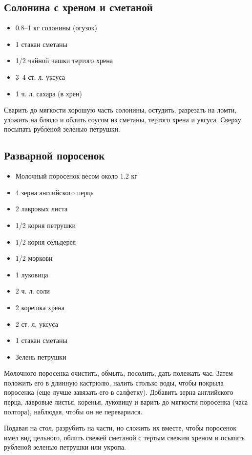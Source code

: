 \subsection{Солонина с хреном и сметаной}

\begin{itemize}
	\item 0.8–1 кг солонины (огузок) 
    \item 1 стакан сметаны
    \item 1/2 чайной чашки тертого хрена
    \item 3–4 ст. л. уксуса
    \item 1 ч. л. сахара (в хрен)
\end{itemize}

Сварить до мягкости хорошую часть солонины, остудить, разрезать на ломти, уложить на блюдо и облить соусом из сметаны, тертого хрена и уксуса. Сверху посыпать рубленой зеленью петрушки.

\subsection{Разварной поросенок}

\begin{itemize}
	\item Молочный поросенок весом около 1.2 кг 
    \item 4 зерна английского перца 
    \item 2 лавровых листа 
    \item 1/2 корня петрушки
    \item 1/2 корня сельдерея
    \item 1/2 моркови 
    \item 1 луковица
    \item 2 ч. л. соли
    \item 2 корешка хрена 
    \item 2 ст. л. уксуса 
    \item 1 стакан сметаны
    \item Зелень петрушки
\end{itemize}

Молочного поросенка очистить, обмыть, посолить, дать полежать час. Затем положить его в длинную кастрюлю, налить столько воды, чтобы покрыла поросенка (еще лучше завязать его в салфетку). Добавить зерна английского перца, лавровые листья, коренья, луковицу и варить до мягкости поросенка (часа полтора), наблюдая, чтобы он не переварился.

Подавая на стол, разрубить на части, но сложить их вместе, чтобы поросенок имел вид цельного, облить свежей сметаной с тертым свежим хреном и осыпать рубленой зеленью петрушки или укропа.

